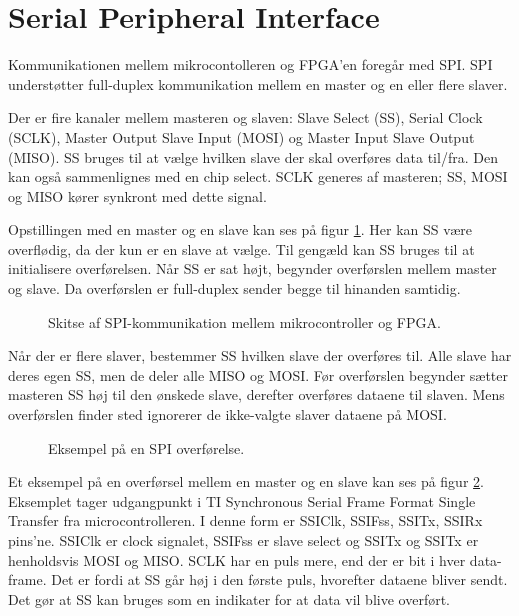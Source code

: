 \section{Serial Peripheral Interface}
\label{app:spi}
Kommunikationen mellem mikrocontolleren og FPGA’en foregår med SPI. 
SPI understøtter full-duplex kommunikation mellem en master og en eller flere slaver.

Der er fire kanaler mellem masteren og slaven: Slave Select (SS), Serial Clock (SCLK), Master Output Slave Input (MOSI) og Master Input Slave Output (MISO). SS bruges til at vælge hvilken slave der skal overføres data til/fra. Den kan også sammenlignes med en chip select. SCLK generes af masteren; SS, MOSI og MISO kører synkront med dette signal.

Opstillingen med en master og en slave kan ses på figur \ref{fig:SPImasterslave}. 
Her kan SS være overflødig, da der kun er en slave at vælge. Til gengæld kan SS bruges til at initialisere overførelsen. 
Når SS er sat højt, begynder overførslen mellem master og slave. Da overførslen er full-duplex sender begge til hinanden samtidig. 
\begin{figure}[!th]
\centering
\begin{tikzpicture}[scale=0.7]

\end{tikzpicture}
\caption[SPI protokol]{Skitse af SPI-kommunikation mellem mikrocontroller og FPGA.}
\label{fig:SPImasterslave}
\end{figure}

Når der er flere slaver, bestemmer SS hvilken slave der overføres til.
Alle slave har deres egen SS, men de deler alle MISO og MOSI. 
Før overførslen begynder sætter masteren SS høj til den ønskede slave,
derefter overføres dataene til slaven.
Mens overførslen finder sted ignorerer de ikke-valgte slaver dataene på MOSI.  

\begin{figure}[!th]
\centering
\begin{tikzpicture}[scale=0.8]

\end{tikzpicture}
\caption[SPI overførelse]{Eksempel på en SPI overførelse.}
\label{fig:SPIfigur}
\end{figure}

Et eksempel på en overførsel mellem en master og en slave kan ses på figur \ref{fig:SPIfigur}. 
Eksemplet tager udgangpunkt i TI Synchronous Serial Frame Format Single Transfer \cite[s. 476]{lm3s6965} fra microcontrolleren.
I denne form er SSIClk, SSIFss, SSITx, SSIRx pins'ne. SSIClk er clock signalet, SSIFss er slave select og SSITx og SSITx er henholdsvis MOSI og MISO.
SCLK har en puls mere, end der er bit i hver data-frame. Det er fordi at SS går høj i den første puls, hvorefter dataene bliver sendt. 
Det gør at SS kan bruges som en indikater for at data vil blive overført.
